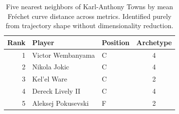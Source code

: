 \begin{table}[htbp]
  \centering\small
  \begin{tabular}{rllc}
    \toprule
    Rank & Player & Position & Archetype \\
    \midrule
    1 & Victor Wembanyama & C & 4 \\
    2 & Nikola Jokic & C & 4 \\
    3 & Kel'el Ware & C & 2 \\
    4 & Dereck Lively II & C & 4 \\
    5 & Aleksej Pokusevski & F & 2 \\
    \bottomrule
  \end{tabular}
  \caption{Five nearest neighbors of Karl-Anthony Towns by mean Fr\'{e}chet curve distance across metrics. Identified purely from trajectory shape without dimensionality reduction.}
  \label{tab:Karl_Anthony_Towns_frechet_curve_neighbors}
\end{table}

